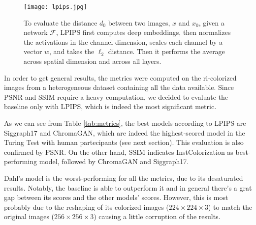 \begin{figure}[h]
	\centering
	\texttt{[image: lpips.jpg]}
	\caption{To evaluate the distance $d_0$ between two images, $x$ and $x_0$, given a network
		$\mathcal{F}$, LPIPS first computes deep embeddings, then normalizes the activations in the channel dimension, scales each channel by a vector $w$, and takes the $\ell_2$ distance. Then it performs the average across spatial dimension and across all layers.}
	\label{fig:lp}
\end{figure}

In order to get general results, the metrics were computed on the ri-colorized images from a heterogeneous dataset containing all the data available. Since PSNR and SSIM require a heavy computation, we decided to evaluate the baseline only with LPIPS, which is indeed the most significant metric.

As we can see from Table \ref{tab:metrics}, the best models according to LPIPS are Siggraph17 and ChromaGAN, which are indeed the highest-scored model in the Turing Test with human partecipants (see next section). This evaluation is also confirmed by PSNR. On the other hand, SSIM indicates InstColorization as best-performing model, followed by ChromaGAN and Siggraph17.

Dahl's model is the worst-performing for all the metrics, due to its desaturated results.
Notably, the baseline is able to outperform it and in general there's a grat gap between its scores and the other models' scores. However, this is most probably due to the reshaping of its colorized images ($224\times224\times3$) to match the original images ($256\times256\times3$) causing a little corruption of the results.
